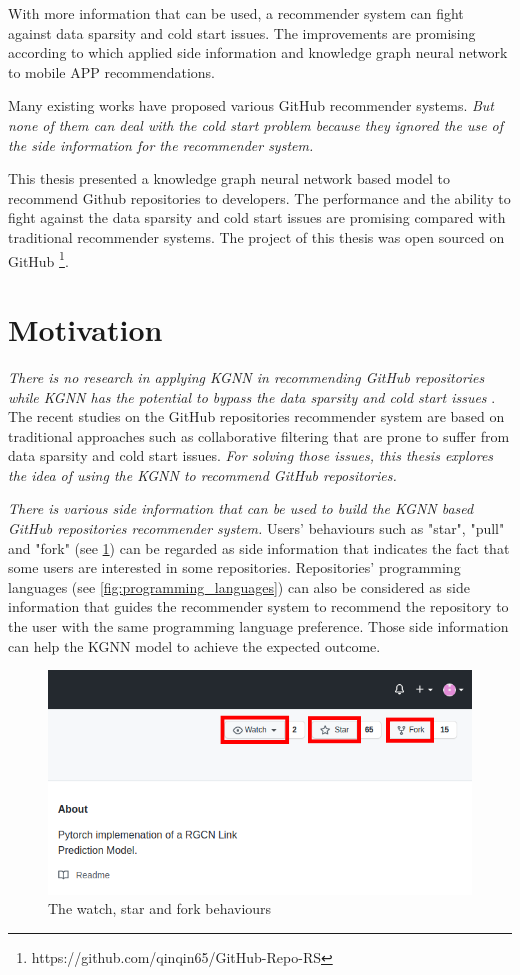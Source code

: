 \documentclass[11pt,twoside]{report}
\begin{document}
With more information that can be used, a recommender system can fight against data sparsity and cold start issues. The improvements are promising according to \cite{zhang_knowledge_2020} which applied side information and knowledge graph neural network to mobile APP recommendations.

Many existing works have proposed various GitHub recommender systems. \textit{But none of them can deal with the cold start problem because they ignored the use of the side information for the recommender system.}

This thesis presented a knowledge graph neural network based model to recommend Github repositories to developers. The performance and the ability to fight against the data sparsity and cold start issues are promising compared with traditional recommender systems. The project of this thesis was open sourced on GitHub \footnote{https://github.com/qinqin65/GitHub-Repo-RS}.

\section{Motivation}
\textit{There is no research in applying KGNN in recommending GitHub repositories while KGNN has the potential to bypass the data sparsity and cold start issues} \cite{mansur_review_nodate}. The recent studies on the GitHub repositories recommender system are based on traditional approaches such as collaborative filtering that are prone to suffer from data sparsity and cold start issues. \textit{For solving those issues, this thesis explores the idea of using the KGNN to recommend GitHub repositories.}

\textit{There is various side information that can be used to build the KGNN based GitHub repositories recommender system.} Users’ behaviours such as "star", "pull" and "fork" (see \ref{fig:watch_star_fork}) can be regarded as side information that indicates the fact that some users are interested in some repositories. Repositories' programming languages (see \ref{fig:programming_languages}) can also be considered as side information that guides the recommender system to recommend the repository to the user with the same programming language preference. Those side information can help the KGNN model to achieve the expected outcome.

\begin{figure}[H]
    \centering
    \includegraphics[scale=0.4]{watch_star_fork.png}
    \caption{The watch, star and fork behaviours}
    \label{fig:watch_star_fork}
\end{figure}
\end{document}
